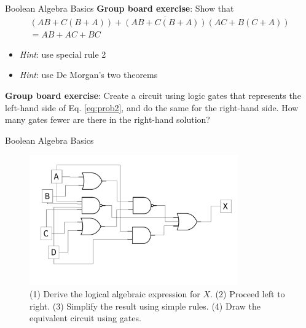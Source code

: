 \documentclass{beamer}
\begin{document}
\begin{frame}{Boolean Algebra Basics}
\small
\textbf{Group board exercise}: Show that
\begin{equation}
\boxed{
\begin{multlined}
(AB+C(B+A))+\overline{(AB+C(B+A))}(AC+B(C+A)) \\ = AB+AC+BC \label{eq:prob2}
\end{multlined}}
\end{equation}
\begin{itemize}
\item \textit{Hint}: use special rule 2
\item \textit{Hint}: use De Morgan's two theorems
\end{itemize}
\textbf{Group board exercise}: Create a circuit using logic gates that represents the left-hand side of Eq. \ref{eq:prob2}, and do the same for the right-hand side.  How many gates fewer are there in the right-hand solution?
\end{frame}

\begin{frame}{Boolean Algebra Basics}
\begin{figure}
\centering
\includegraphics[width=0.8\textwidth]{figures/MultiGate1.pdf}
\caption{\label{fig:multi1} (1) Derive the logical algebraic expression for $X$.  (2) Proceed left to right.  (3) Simplify the result using simple rules. (4) Draw the equivalent circuit using gates.}
\end{figure}
\end{frame}
\end{document}
